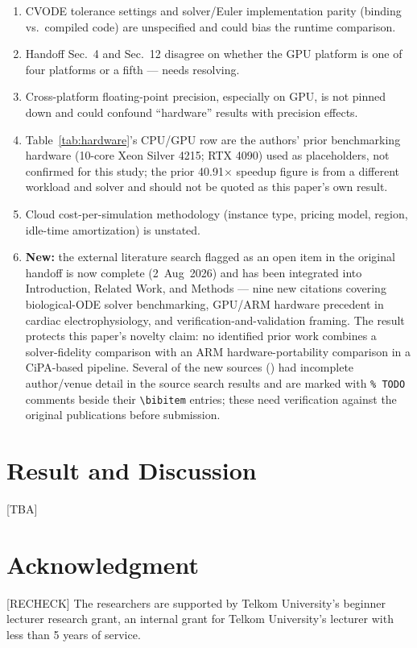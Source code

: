 \documentclass[journal]{IEEEtran}
\begin{document}
\begin{enumerate}
\item CVODE tolerance settings and solver/Euler implementation parity (binding vs.\ compiled code) are unspecified and could bias the runtime comparison.
\item Handoff Sec.~4 and Sec.~12 disagree on whether the GPU platform is one of four platforms or a fifth --- needs resolving.
\item Cross-platform floating-point precision, especially on GPU, is not pinned down and could confound ``hardware'' results with precision effects.
\item Table~\ref{tab:hardware}'s CPU/GPU row are the authors' prior benchmarking hardware (10-core Xeon Silver 4215; RTX 4090) \cite{pramawijaya2024thesis} used as placeholders, not confirmed for this study; the prior 40.91$\times$ speedup figure is from a different workload and solver and should not be quoted as this paper's own result.
\item Cloud cost-per-simulation methodology (instance type, pricing model, region, idle-time amortization) is unstated.
\item \textbf{New:} the external literature search flagged as an open item in the original handoff is now complete (2~Aug~2026) and has been integrated into Introduction, Related Work, and Methods --- nine new citations covering biological-ODE solver benchmarking, GPU/ARM hardware precedent in cardiac electrophysiology, and verification-and-validation framing. The result protects this paper's novelty claim: no identified prior work combines a solver-fidelity comparison with an ARM hardware-portability comparison in a CiPA-based pipeline. Several of the new sources (\cite{benchmarking2021,eulerprecision2013,armhpc2023,torchcor2025,bartocci2015,sachetto2025,invitro2020}) had incomplete author/venue detail in the source search results and are marked with \texttt{\% TODO} comments beside their \texttt{\textbackslash bibitem} entries; these need verification against the original publications before submission.
\end{enumerate}

\section{Result and Discussion}
[TBA]

\section*{Acknowledgment}
[RECHECK] The researchers are supported by Telkom University's beginner lecturer research grant, an internal grant for Telkom University's lecturer with less than 5 years of service.
\end{document}
